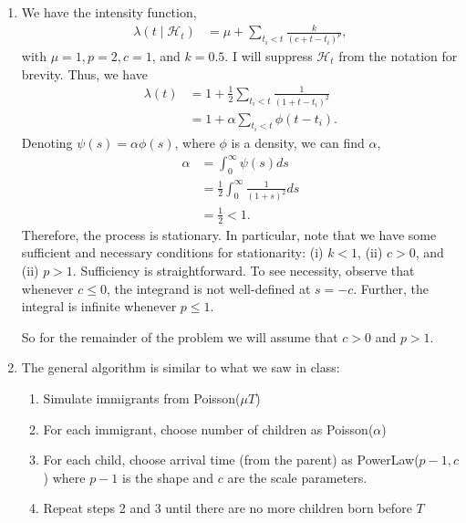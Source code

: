 \documentclass[11pt]{article}
\begin{document}
\begin{enumerate}
\begin{enumerate}
\item We have the intensity function,
\begin{align*}
	\lambda(t \mid \mathcal{H}_t) &= \mu + \sum_{t_i < t} \frac{k}{(c + t - t_i)^p},
\end{align*}
with $\mu = 1, p = 2, c = 1$, and $k = 0.5$. I will suppress $\mathcal{H}_t$ from the notation for brevity. Thus, we have
\begin{align*}
	\lambda(t) &= 1 + \frac{1}{2} \sum_{t_i < t} \frac{1}{(1 + t - t_i)^2} \\
	&= 1 + \alpha \sum_{t_i < t} \phi(t - t_i).
\end{align*}
Denoting $\psi(s) = \alpha \phi(s)$, where $\phi$ is a density, we can find $\alpha$,
\begin{align*}
	\alpha &= \int_0^{\infty} \psi(s) ds \\
	&= \frac{1}{2} \int_0^{\infty} \frac{1}{(1 + s)^2} ds \\
	&= \frac{1}{2} < 1.
\end{align*}
Therefore, the process is stationary. In particular, note that we have some sufficient and necessary conditions for stationarity: (i) $k < 1$, (ii) $c > 0$, and (ii) $p > 1$. Sufficiency is straightforward. To see necessity, observe that whenever $c \leq 0$, the integrand is not well-defined at $s = -c$. Further, the integral is infinite whenever $p \leq 1$.

So for the remainder of the problem we will assume that $c > 0$ and $p > 1$.

\item The general algorithm is similar to what we saw in class:
\begin{enumerate}
\item Simulate immigrants from Poisson($\mu T$)
\item For each immigrant, choose number of children as Poisson($\alpha$)
\item For each child, choose arrival time (from the parent) as PowerLaw($p-1, c$) where $p-1$ is the shape and $c$ are the scale parameters.
\item Repeat steps 2 and 3 until there are no more children born before $T$
\end{enumerate}


\end{enumerate}
\end{enumerate}
\end{document}
